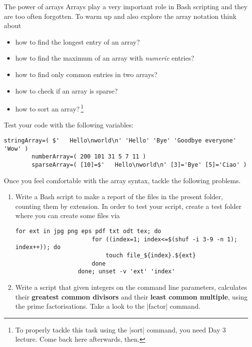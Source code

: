 
\begin{exercise}[Instructive]{The power of arrays}
    Arrays play a very important role in Bash scripting and they are too often forgotten.
    To warm up and also explore the array notation think about
    \begin{itemize}[nosep]
        \item how to find the longest entry of an array?
        \item how to find the maximum of an array with \emph{numeric} entries?
        \item how to find only common entries in two arrays?
        \item how to check if an array is sparse?
        \item how to sort an array?\,\footnote{To properly tackle this task using the \bash|sort| command, you need Day 3 lecture. Come back here afterwards, then.}
    \end{itemize}
    Test your code with the following variables:
    \begin{lstlisting}[style=MyBash, emph={[2]stringArray, numberArray, sparseArray}]
        stringArray=( $'   Hello\nworld\n' 'Hello' 'Bye' 'Goodbye everyone' 'Wow' )
        numberArray=( 200 101 31 5 7 11 )
        sparseArray=( [10]=$'   Hello\nworld\n' [3]='Bye' [5]='Ciao' )
    \end{lstlisting}

    Once you feel comfortable with the array syntax, tackle the following problems.
    \begin{enumerate}[after=\vspace{-\baselineskip}]
        \item Write a Bash script to make a report of the files in the present folder, counting them by extension.
              In order to test your script, create a test folder where you can create some files via
              \begin{lstlisting}[style=MyBash, emph={[2]ext, index}, alsoletter={0123456789![]/\{\}.:}]
                  for ext in jpg png eps pdf txt odt tex; do
                      for ((index=1; index<=$(shuf -i 3-9 -n 1); index++)); do
                          touch file_${index}.${ext}
                      done
                  done; unset -v 'ext' 'index'
              \end{lstlisting}
        \item Write a script that given integers on the command line parameters, calculates their \textbf{greatest common divisors} and their \textbf{least common multiple}, using the prime factorisations.
              Take a look to the \bash|factor| command.
    \end{enumerate}
    \bigskip
\end{exercise}
